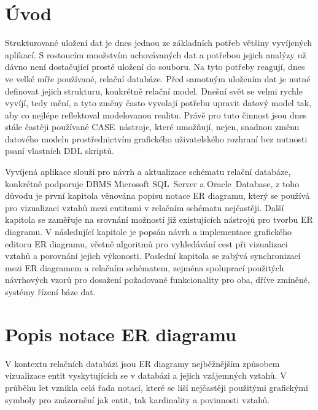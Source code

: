 \documentclass[czech,bachelor,public,dept460,male,oneside]{diploma}
\begin{document}
\MakeTitlePages

\lstlistoflistings

\section{Úvod}
Strukturované uložení dat je dnes jednou ze základních potřeb většiny vyvíjených aplikací. S rostoucím množstvím uchovávaných dat a potřebou jejich analýzy už dávno není dostačující prosté uložení do souboru. Na tyto potřeby reagují, dnes ve velké míře používané, relační databáze. Před samotným uložením dat je nutné definovat jejich strukturu, konkrétně relační model. Dnešní svět se velmi rychle vyvíjí, tedy mění, a tyto změny často vyvolají potřebu upravit datový model tak, aby co nejlépe reflektoval modelovanou realitu. Právě pro tuto činnost jsou dnes stále častěji používané CASE~nástroje, které umožňují, nejen, snadnou změnu datového modelu prostřednictvím grafického uživatelského rozhraní bez nutnosti psaní vlastních DDL skriptů.

Vyvíjená aplikace slouží pro návrh a aktualizace schématu relační databáze, konkrétně podporuje DBMS Microsoft SQL~Server a Oracle~Database, z toho důvodu je první kapitola věnována popisu notace ER diagramu, který se používá pro vizualizaci vztahů mezi entitami v relačním schématu nejčastěji. Další kapitola se zaměřuje na srovnání možností již existujících nástrojů pro tvorbu ER diagramu. V následující kapitole je popsán návrh a implementace grafického editoru ER diagramu, včetně algoritmů pro vyhledávání cest při vizualizaci vztahů a porovnání jejich výkonosti. Poslední kapitola se zabývá synchronizací mezi ER diagramem a relačním schématem, zejména spoluprací použitých návrhových vzorů pro dosažení požadované funkcionality pro oba, dříve zmíněné, systémy řízení báze dat.

\section{Popis notace ER diagramu}
V kontextu relačních databázi jsou ER diagramy nejběžnějším způsobem vizualizace entit vyskytujících se v databázi a jejich vzájemných vztahů. V průběhu let vznikla celá řada notací, které se liší nejčastěji použitými grafickými symboly pro znázornění jak entit, tak kardinality a povinnosti vztahů.
\end{document}
